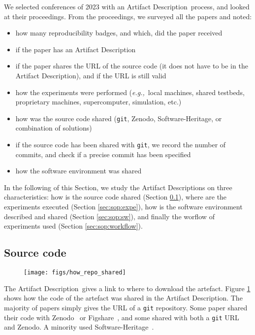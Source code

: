 \documentclass[sigconf]{acmart}
\newcommand{\eg}{\emph{e.g.,}}
\newcommand{\ad}{Artifact Description}
\begin{document}
We selected conferences of 2023 with an \ad\ process, and looked at their proceedings.
From the proceedings, we surveyed all the papers and noted:

\begin{itemize}
  \item how many reproducibility badges, and which, did the paper received
  \item if the paper has an \ad
  \item if the paper shares the URL of the source code (it does not have to be in the \ad), and if the URL is still valid
  \item how the experiments were performed (\eg\ local machines, shared testbeds, proprietary machines, supercomputer, simulation, etc.)
  \item how was the source code shared (\texttt{git}, Zenodo, Software-Heritage, or combination of solutions)
  \item if the source code has been shared with \texttt{git}, we record the number of commits, and check if a precise commit has been specified
  \item how the software environment was shared
\end{itemize}


In the following of this Section, we study the \ad s on three characteristics: how is the source code shared (Section \ref{sec:sop:src}), where are the experiments executed (Section \ref{sec:sop:expe}), how is the software environment described and shared (Section \ref{sec:sop:sw}), and finally the worflow of experiments used (Section \ref{sec:sop:workflow}).

\subsection{Source code}\label{sec:sop:src}


\begin{figure}
  \centering
  \texttt{[image: figs/how\_repo\_shared]}
  \caption{}\label{fig:how_repo_shared}
\end{figure}

The \ad\ gives a link to where to download the artefact.
Figure \ref{fig:how_repo_shared} shows how the code of the artefact was shared in the \ad.
The majority of papers simply gives the URL of a \texttt{git} repository.
Some paper shared their code with Zenodo\ \cite{zenodo} or Figshare\ \cite{figshare}, and some shared with both a \texttt{git} URL and Zenodo.
A minority used Software-Heritage\ \cite{swheritage}.
\end{document}
